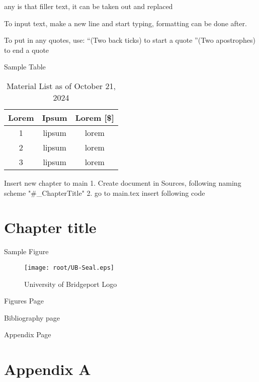 
any \lipsum is that filler text, it can be taken out and replaced

To input text, make a new line and start typing, formatting can be done after.

To put in any quotes, use:
    ``(Two back ticks) to start a quote 
    ''(Two apostrophes) to end a quote

Sample Table
\begin{table}[H]
    \centering
    \caption{Material List as of October 21, 2024}
    \begin{tabular}{|c|c|c|}
    \centering
    \textbf{Lorem} & \textbf{Ipsum} & \textbf{Lorem [\$]} \\ \hline \hline
1   & lipsum    & lorem     \\ \hline   
2   & lipsum    & lorem   \\ \hline
3   & lipsum    & lorem  
    \end{tabular}
    \label{tab:table1}
\end{table}

Insert new chapter to main
1. Create document in Sources, following naming scheme "#_ChapterTitle"
2. go to main.tex
insert following code
\newpage
\section{Chapter title} \label{ch#}


Sample Figure
\begin{figure}[H]
    \centering
    \texttt{[image: root/UB-Seal.eps]}
    \caption{University of Bridgeport Logo \cite{UB_Logo}}
    \label{fig:UB_Logo}
\end{figure}

Figures Page
\newpage
{} 
\listoffigures
\thispagestyle{fancy}

Bibliography page
\newpage
{}
 


Appendix Page
\newpage
\section{Appendix A} \label{ch6}
